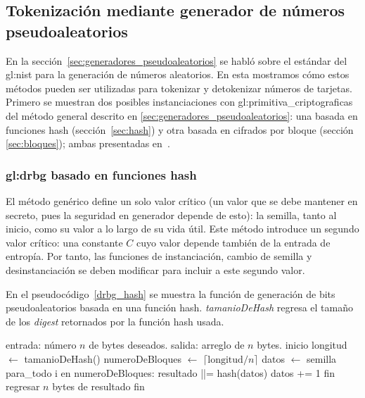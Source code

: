 %
%
%

\subsection{Tokenización mediante generador de números pseudoaleatorios}
\label{sec:drbg_lista}

En la sección~\ref{sec:generadores_pseudoaleatorios} se habló sobre el
estándar del \gls{gl:nist} para la generación de números aleatorios. En esta
mostramos cómo estos métodos pueden ser utilizadas para tokenizar y detokenizar
números de tarjetas. Primero se muestran dos posibles instanciaciones
con \glspl{gl:primitiva_criptografica} del método general descrito en
\ref{sec:generadores_pseudoaleatorios}: una basada en funciones hash
(sección~\ref{sec:hash}) y otra basada en cifrados por bloque (sección
\ref{sec:bloques}); ambas presentadas en~\cite{nist_aleatorios}.

\subsubsection{\texorpdfstring{\acrshort{gl:drbg}}{DRBG} basado en funciones %
hash}

El método genérico define un solo valor crítico (un valor que se debe mantener
en secreto, pues la seguridad en generador depende de esto): la semilla, tanto
al inicio, como su valor a lo largo de su vida útil. Este método introduce
un segundo valor crítico: una constante $ C $ cuyo valor depende también de
la entrada de entropía. Por tanto, las funciones de instanciación,
cambio de semilla y desinstanciación se deben modificar para incluir
a este segundo valor.

En el pseudocódigo~\ref{drbg_hash} se muestra la función de generación de bits
pseudoaleatorios basada en una función hash. \textit{tamanioDeHash} regresa el
tamaño de los \textit{digest} retornados por la función hash usada.

\begin{pseudocodigo}[%
    caption={Generación de bits pseudoaleatorios mediante función hash},
    label={drbg_hash}%
  ]
    entrada: número $ n $ de bytes deseados.
    salida:  arreglo de $ n $ bytes.
    inicio
      longitud $ \gets $ tamanioDeHash()
      numeroDeBloques $ \gets $ $ \lceil \text{longitud} / n \rceil $
      datos $ \gets $ semilla
      para_todo i en numeroDeBloques:
        resultado ||= hash(datos)
        datos += 1
      fin
      regresar $ n $ bytes de resultado
    fin
\end{pseudocodigo}

